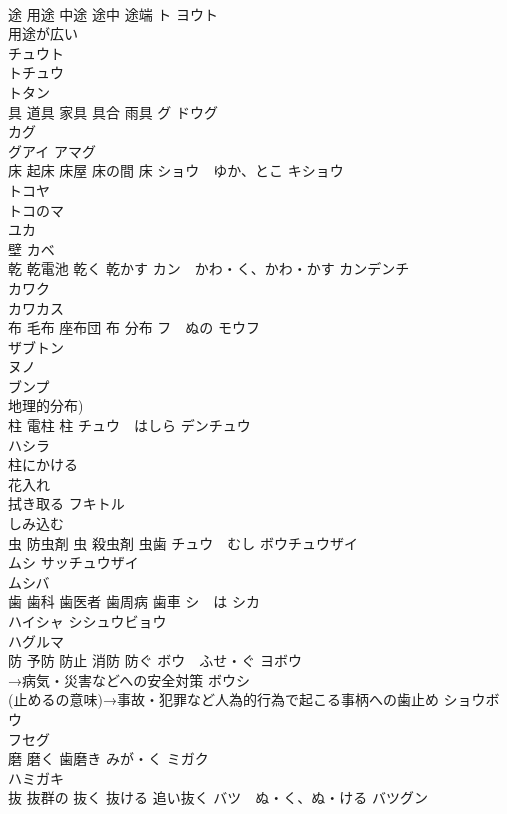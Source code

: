 \documentclass[8pt]{extreport}
\begin{document}
\begin{CJK}{UTF8}{min}
\\	途 用途 中途 途中 途端	ト ヨウト 
\\	用途が広い 
\\	チュウト 
\\	トチュウ 
\\	トタン 
\\	具 道具 家具 具合 雨具	グ ドウグ 
\\	カグ 
\\	グアイ アマグ 
\\	床 起床 床屋 床の間 床	ショウ　ゆか、とこ キショウ 
\\	トコヤ 
\\	トコのマ　
\\	ユカ 
\\	壁	カベ 
\\	乾 乾電池 乾く 乾かす	カン　かわ・く、かわ・かす カンデンチ 
\\	カワク 
\\	カワカス　
\\	布 毛布 座布団 布 分布	フ　ぬの モウフ 
\\	ザブトン 
\\	ヌノ　
\\	ブンプ 
\\	地理的分布)
\\	柱 電柱 柱	チュウ　はしら デンチュウ 
\\	ハシラ 
\\	柱にかける
\\	花入れ	
\\	拭き取る	フキトル 
\\	しみ込む	
\\	虫 防虫剤 虫 殺虫剤 虫歯	チュウ　むし ボウチュウザイ 
\\	ムシ サッチュウザイ 
\\	ムシバ
\\	歯 歯科 歯医者 歯周病 歯車	シ　は シカ 
\\	ハイシャ シシュウビョウ 
\\	ハグルマ
\\	防 予防 防止 消防 防ぐ	ボウ　ふせ・ぐ ヨボウ 
\\	→病気・災害などへの安全対策 ボウシ 
\\	(止めるの意味)→事故・犯罪など人為的行為で起こる事柄への歯止め ショウボウ 
\\	フセグ 
\\	磨 磨く 歯磨き	みが・く ミガク 
\\	ハミガキ 
\\	抜 抜群の 抜く 抜ける 追い抜く	バツ　ぬ・く、ぬ・ける バツグン 

\end{CJK}
\end{document}
